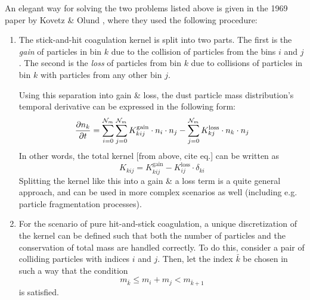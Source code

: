         An elegant way for solving the two problems listed above is given in the 1969 paper
        by Kovetz \& Olund \cite{kovetz_olund_1969}, where they used the following procedure:
        \begin{enumerate}
            \item The stick-and-hit coagulation kernel is split into two parts. The first is
                the \textit{gain} of particles in bin $k$ due to the collision of particles from the
                bins $i$ and $j$. The second is the \textit{loss} of particles from bin $k$ due to
                collisions of particles in bin $k$ with particles from any other bin $j$.
            
                Using this separation into gain \& loss, the dust particle mass distribution's
                temporal derivative can be expressed in the following form:
                \begin{equation}
                    \frac{\partial n_k}{\partial t}
                        =\sum_{i=0}^{\mathcal N_m}\sum_{j=0}^{\mathcal N_m}
                            K_{kij}^\text{gain}\cdot n_i\cdot n_j
                        -\sum_{j=0}^{\mathcal N_m}K_{kj}^\text{loss}\cdot n_k\cdot n_j
                \end{equation}
                In other words, the total kernel [from above, cite eq.] can be written as
                \begin{equation}
                    K_{kij}
                        =K_{kij}^\text{gain}
                        -K_{ij}^\text{loss}\cdot\delta_{ki}
                \end{equation}
                Splitting the kernel like this into a gain \& a loss term is a quite general
                approach, and can be used in more complex scenarios as well (including e.g.
                particle fragmentation processes).
            \item For the scenario of pure hit-and-stick coagulation, a unique discretization
                of the kernel can be defined such that both the number of particles and the
                conservation of total mass are handled correctly. To do this, consider a
                pair of colliding particles with indices $i$ and $j$. Then, let the index
                $\bar k$ be chosen in such a way that the condition
                \begin{equation}
                    m_{\bar k}\leq m_i+m_j<m_{\bar k+1}
                \end{equation}
                is satisfied.

\end{enumerate}
